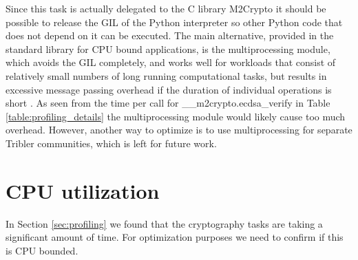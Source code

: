 Since this task is actually delegated to the C library M2Crypto it should be possible to release the GIL of the Python interpreter so other Python code that does not depend on it can be executed.
The main alternative, provided in the standard library for CPU bound applications, is the multiprocessing module, which avoids the GIL completely, and works well for workloads that consist of relatively small numbers of long running computational tasks, but results in excessive message passing overhead if the duration of individual operations is short \cite{multicore_python}.
As seen from the time per call for \_\_m2crypto.ecdsa\_verify in Table \ref{table:profiling_details} the multiprocessing module would likely cause too much overhead.
However, another way to optimize is to use multiprocessing for separate Tribler communities, which is left for future work.


\section{CPU utilization}\label{sec:cpu_utilization}
In Section \ref{sec:profiling} we found that the cryptography tasks are taking a significant amount of time.
For optimization purposes we need to confirm if this is CPU bounded.

